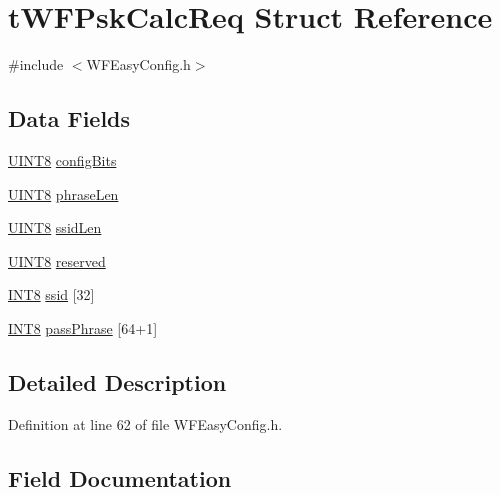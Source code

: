 \hypertarget{structt_w_f_psk_calc_req}{}\section{t\+W\+F\+Psk\+Calc\+Req Struct Reference}
\label{structt_w_f_psk_calc_req}


{\ttfamily \#include $<$W\+F\+Easy\+Config.\+h$>$}

\subsection*{Data Fields}
\begin{DoxyCompactItemize}
\item 
\hyperlink{_generic_type_defs_8h_ab27e9918b538ce9d8ca692479b375b6a}{U\+I\+N\+T8} \hyperlink{structt_w_f_psk_calc_req_ac647026e8a19db5066c293ed43dce082}{config\+Bits}
\item 
\hyperlink{_generic_type_defs_8h_ab27e9918b538ce9d8ca692479b375b6a}{U\+I\+N\+T8} \hyperlink{structt_w_f_psk_calc_req_ad3b8bff638ea0b505e7236bf04c79f25}{phrase\+Len}
\item 
\hyperlink{_generic_type_defs_8h_ab27e9918b538ce9d8ca692479b375b6a}{U\+I\+N\+T8} \hyperlink{structt_w_f_psk_calc_req_a2172fc4e4cae6a48b945435288912995}{ssid\+Len}
\item 
\hyperlink{_generic_type_defs_8h_ab27e9918b538ce9d8ca692479b375b6a}{U\+I\+N\+T8} \hyperlink{structt_w_f_psk_calc_req_a61b1cfce69fc0011cd7b07b127a3f3f6}{reserved}
\item 
\hyperlink{_generic_type_defs_8h_a7ebe70ceca856797319175e30bcf003d}{I\+N\+T8} \hyperlink{structt_w_f_psk_calc_req_ac951c37257280e8e3ce11cea1f115d4a}{ssid} \mbox{[}32\mbox{]}
\item 
\hyperlink{_generic_type_defs_8h_a7ebe70ceca856797319175e30bcf003d}{I\+N\+T8} \hyperlink{structt_w_f_psk_calc_req_a0409b2624b6a452364ada6c1f9cf8185}{pass\+Phrase} \mbox{[}64+1\mbox{]}
\end{DoxyCompactItemize}


\subsection{Detailed Description}


Definition at line 62 of file W\+F\+Easy\+Config.\+h.



\subsection{Field Documentation}
\hypertarget{structt_w_f_psk_calc_req_ac647026e8a19db5066c293ed43dce082}{}
